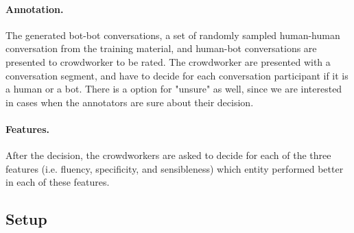 \documentclass[11pt,a4paper]{article}
\begin{document}
\paragraph{Annotation.} The generated bot-bot conversations, a set of randomly sampled human-human conversation from the training material, and human-bot conversations are presented to crowdworker to be rated. The crowdworker are presented with a conversation segment, and have to decide for each conversation participant if it is a human or a bot. There is a option for "unsure" as well, since we are interested in cases when the annotators are sure about their decision. 
\paragraph{Features.} After the decision, the crowdworkers are asked to decide for each of the three features (i.e. fluency, specificity, and sensibleness) which entity performed better in each of these features. 

\subsection{Setup}

\begin{table}[h!]
\vspace{-1mm}
\begin{center}
\begin{small}
\end{small}
\\~\\
  \vspace{1mm}
\end{center}
\caption{Overview of the domains}
\label{table:domain-overview}
\end{table}
\end{document}
